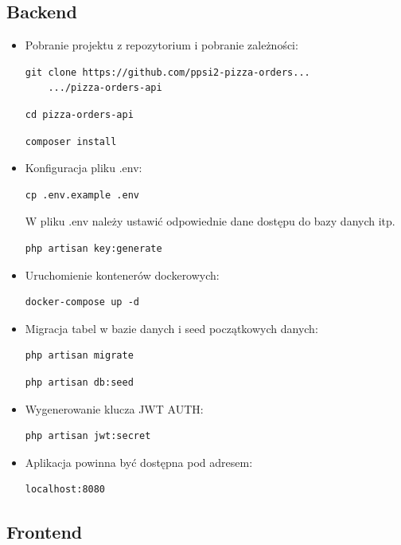\documentclass[12pt]{article}
\begin{document}
\subsection{Backend}

\begin{itemize}
	\item Pobranie projektu z repozytorium i pobranie zależności:
	\begin{lstlisting}[]
	git clone https://github.com/ppsi2-pizza-orders...
	.../pizza-orders-api
	\end{lstlisting}
	\begin{lstlisting}[]
	cd pizza-orders-api
	\end{lstlisting}
	\begin{lstlisting}[]
	composer install
	\end{lstlisting}
	\item Konfiguracja pliku .env:
	\begin{lstlisting}[]
	cp .env.example .env
	\end{lstlisting}
	W pliku .env należy ustawić odpowiednie dane dostępu do bazy danych itp.
	\begin{lstlisting}[]
	php artisan key:generate
	\end{lstlisting}
	\item Uruchomienie kontenerów dockerowych:
	\begin{lstlisting}[]
	docker-compose up -d
	\end{lstlisting}
	\item Migracja tabel w bazie danych i seed początkowych danych:
	\begin{lstlisting}[]
	php artisan migrate
	\end{lstlisting}
	\begin{lstlisting}[]
	php artisan db:seed
	\end{lstlisting}
	\item Wygenerowanie klucza JWT AUTH:
	\begin{lstlisting}[]
	php artisan jwt:secret
	\end{lstlisting}
	\item Aplikacja powinna być dostępna pod adresem:
	\begin{lstlisting}[]
	localhost:8080
	\end{lstlisting}
\end{itemize}

\clearpage

\subsection{Frontend}
\end{document}
